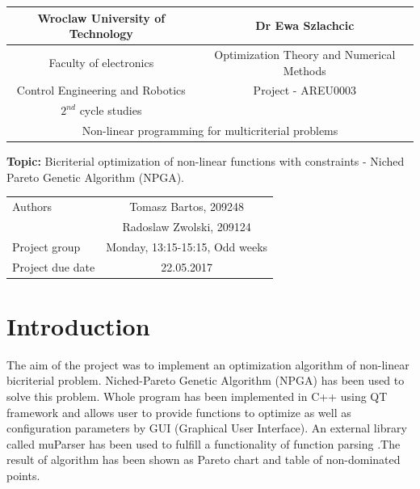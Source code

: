 \documentclass[a4paper, 11pt]{article}
\begin{document}
\renewcommand*\contentsname{Table of contents}
	\begin{center}
		\begin{tabular}{| c | c |}
		\hline
		Wroclaw University of Technology & Dr Ewa Szlachcic\\ \hline
		Faculty of electronics & Optimization Theory and
		Numerical Methods \\
		Control Engineering and Robotics & Project - AREU0003\\
		$2^{nd}$ cycle studies & \\ \hline
		\multicolumn{2}{c}{Non-linear programming for multicriterial problems}\\
			\hline
	\end{tabular}			
	\end{center}
	
	\textbf{Topic:} Bicriterial optimization of non-linear functions with
	constraints - Niched Pareto Genetic Algorithm (NPGA).
	
	\begin{center}
		\begin{tabular}{| l | c |}
		\hline
		Authors & Tomasz Bartos, 209248\\
				& Radoslaw Zwolski, 209124\\ \hline
		Project group & Monday, 13:15-15:15, Odd weeks\\ \hline
		Project due date & 22.05.2017\\
		\hline
	\end{tabular}
	\end{center}
	
	\newpage
	
	\tableofcontents
	
	\newpage

	\section{Introduction}
	
	The aim of the project was to implement an optimization algorithm of non-linear
	bicriterial problem. Niched-Pareto Genetic Algorithm (NPGA) \cite{OptymailzacjaWielokryterialna} has been used to
	solve this problem. Whole program has been implemented in C++ using QT 	
	framework \cite{Qt} and allows user to provide functions to optimize as well 
	as configuration parameters by GUI (Graphical User Interface). An external
	library called muParser \cite{MuParser} has been used to fulfill a functionality of
	function parsing .The result of algorithm has been shown as Pareto chart and
	table of non-dominated points.
	
\end{document}
